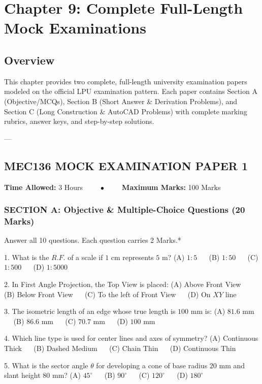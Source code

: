 \chapter{Chapter 9: Complete Full-Length Mock Examinations}

\section{Overview}
This chapter provides two complete, full-length university examination papers modeled on the official LPU examination pattern. Each paper contains Section A (Objective/MCQs), Section B (Short Answer \& Derivation Problems), and Section C (Long Construction \& AutoCAD Problems) with complete marking rubrics, answer keys, and step-by-step solutions.

---

\section{MEC136 MOCK EXAMINATION PAPER 1}

\noindent \textbf{Time Allowed:} 3 Hours $\qquad \bullet \qquad$ \textbf{Maximum Marks:} 100 Marks

\subsection{SECTION A: Objective \& Multiple-Choice Questions (20 Marks)}
\noindent *Answer all 10 questions. Each question carries 2 Marks.*

1. What is the $R.F.$ of a scale if $1\text{ cm}$ represents $5\text{ m}$?  
   (A) $1:5$ $\quad$ (B) $1:50$ $\quad$ (C) $1:500$ $\quad$ (D) $1:5000$

2. In First Angle Projection, the Top View is placed:  
   (A) Above Front View $\quad$ (B) Below Front View $\quad$ (C) To the left of Front View $\quad$ (D) On $XY$ line

3. The isometric length of an edge whose true length is $100\text{ mm}$ is:  
   (A) $81.6\text{ mm}$ $\quad$ (B) $86.6\text{ mm}$ $\quad$ (C) $70.7\text{ mm}$ $\quad$ (D) $100\text{ mm}$

4. Which line type is used for center lines and axes of symmetry?  
   (A) Continuous Thick $\quad$ (B) Dashed Medium $\quad$ (C) Chain Thin $\quad$ (D) Continuous Thin

5. What is the sector angle $\theta$ for developing a cone of base radius $20\text{ mm}$ and slant height $80\text{ mm}$?  
   (A) $45^\circ$ $\quad$ (B) $90^\circ$ $\quad$ (C) $120^\circ$ $\quad$ (D) $180^\circ$

